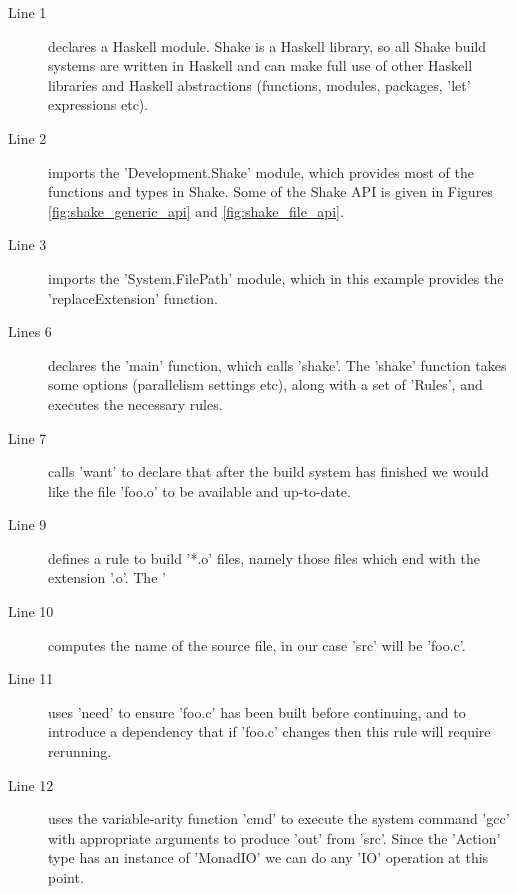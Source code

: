 \begin{description}
\item[Line 1] declares a Haskell module. Shake is a Haskell library, so all Shake build systems are written in Haskell and can make full use of other Haskell libraries and Haskell abstractions (functions, modules, packages, \lst'let' expressions etc).
\item[Line 2] imports the \lst'Development.Shake' module, which provides most of the functions and types in Shake. Some of the Shake API is given in Figures \ref{fig:shake_generic_api} and \ref{fig:shake_file_api}.
\item[Line 3] imports the \lst'System.FilePath' module, which in this example provides the \lst'replaceExtension' function.
\item[Lines 6] declares the \lst'main' function, which calls \lst'shake'. The \lst'shake' function takes some options (parallelism settings etc), along with a set of \lst'Rules', and executes the necessary rules.
\item[Line 7] calls \lst'want' to declare that after the build system has finished we would like the file \lst'foo.o' to be available and up-to-date.
\item[Line 9] defines a rule to build \lst'*.o' files, namely those files which end with the extension \lst'.o'. The \lst'%
\item[Line 10] computes the name of the source file, in our case \lst'src' will be \lst'foo.c'.
\item[Line 11] uses \lst'need' to ensure \lst'foo.c' has been built before continuing, and to introduce a dependency that if \lst'foo.c' changes then this rule will require rerunning.
\item[Line 12] uses the variable-arity function \lst'cmd' to execute the system command \lst'gcc' with appropriate arguments to produce \lst'out' from \lst'src'. Since the \lst'Action' type has an instance of \lst'MonadIO' we can do any \lst'IO' operation at this point.
\end{description}


